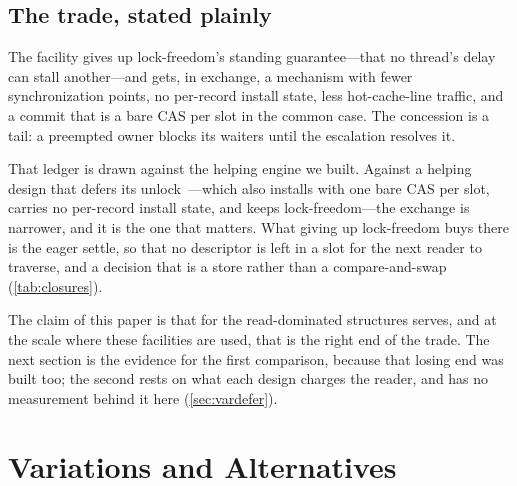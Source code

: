 \documentclass[11pt]{article}
\begin{document}
\subsection{The trade, stated plainly}
\label{sec:trade}

The facility gives up lock-freedom's standing guarantee---that no thread's delay
can stall another---and gets, in exchange, a mechanism with fewer synchronization
points, no per-record install state, less hot-cache-line traffic, and a commit
that is a bare CAS per slot in the common case. The concession is a tail: a
preempted owner blocks its waiters until the escalation resolves it.

That ledger is drawn against the helping engine we built. Against a helping
design that defers its unlock~\citep{guerraoui2020mcas}---which also installs
with one bare CAS per slot, carries no per-record install state, and keeps
lock-freedom---the exchange is narrower, and it is the one that matters. What
giving up lock-freedom buys there is the eager settle, so that no descriptor is
left in a slot for the next reader to traverse, and a decision that is a store
rather than a compare-and-swap (\cref{tab:closures}).

The claim of
this paper is that for the read-dominated structures \rcu serves, and at the
scale where these facilities are used, that is the right end of the trade. The
next section is the evidence for the first comparison, because that losing end
was built too; the second rests on what each design charges the reader, and has
no measurement behind it here (\cref{sec:vardefer}).

\section{Variations and Alternatives}
\label{sec:variations}

%
\end{document}
